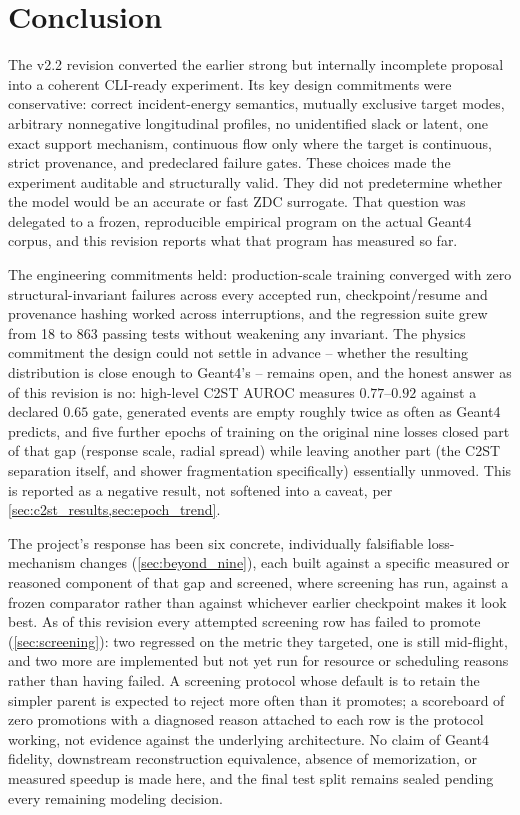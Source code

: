 \documentclass[10pt,a4paper]{article}
\begin{document}
\section{Conclusion}

The v2.2 revision converted the earlier strong but internally incomplete proposal into a coherent CLI-ready experiment. Its key design commitments were conservative: correct incident-energy semantics, mutually exclusive target modes, arbitrary nonnegative longitudinal profiles, no unidentified slack or latent, one exact support mechanism, continuous flow only where the target is continuous, strict provenance, and predeclared failure gates. These choices made the experiment auditable and structurally valid. They did not predetermine whether the model would be an accurate or fast ZDC surrogate. That question was delegated to a frozen, reproducible empirical program on the actual Geant4 corpus, and this revision reports what that program has measured so far.

The engineering commitments held: production-scale training converged with zero structural-invariant failures across every accepted run, checkpoint/resume and provenance hashing worked across interruptions, and the regression suite grew from 18 to 863 passing tests without weakening any invariant. The physics commitment the design could not settle in advance -- whether the resulting distribution is close enough to Geant4's -- remains open, and the honest answer as of this revision is no: high-level C2ST AUROC measures $0.77$--$0.92$ against a declared $0.65$ gate, generated events are empty roughly twice as often as Geant4 predicts, and five further epochs of training on the original nine losses closed part of that gap (response scale, radial spread) while leaving another part (the C2ST separation itself, and shower fragmentation specifically) essentially unmoved. This is reported as a negative result, not softened into a caveat, per \cref{sec:c2st_results,sec:epoch_trend}.

The project's response has been six concrete, individually falsifiable loss-mechanism changes (\cref{sec:beyond_nine}), each built against a specific measured or reasoned component of that gap and screened, where screening has run, against a frozen comparator rather than against whichever earlier checkpoint makes it look best. As of this revision every attempted screening row has failed to promote (\cref{sec:screening}): two regressed on the metric they targeted, one is still mid-flight, and two more are implemented but not yet run for resource or scheduling reasons rather than having failed. A screening protocol whose default is to retain the simpler parent is expected to reject more often than it promotes; a scoreboard of zero promotions with a diagnosed reason attached to each row is the protocol working, not evidence against the underlying architecture. No claim of Geant4 fidelity, downstream reconstruction equivalence, absence of memorization, or measured speedup is made here, and the final test split remains sealed pending every remaining modeling decision.
\end{document}
